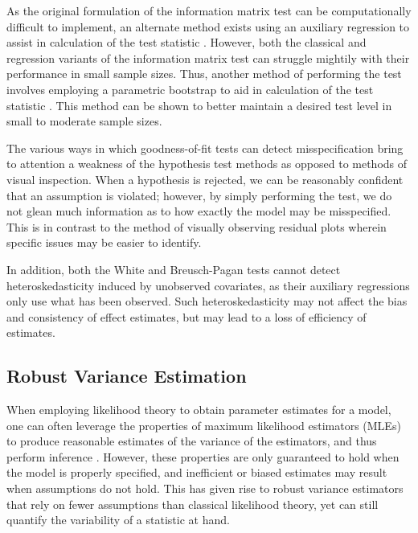 \documentclass[review]{elsarticle}
\begin{document}
        As the original formulation of the information matrix test can be computationally difficult to implement, an alternate method exists using an
		auxiliary regression to assist in calculation of the test statistic \citep{Chesher}. However, both the classical and regression variants of the information matrix test can struggle mightily with their performance in small sample sizes. Thus, another method of performing the test involves employing a parametric bootstrap to aid in calculation of the test statistic \citep{Dhaene}. This method can be shown to better maintain a desired test level in small to moderate sample sizes. 

		The various ways in which goodness-of-fit tests can detect misspecification bring to attention a weakness of the hypothesis test methods as opposed to methods of visual inspection.
		When a hypothesis is rejected, we can be reasonably confident that an assumption is violated; however, by simply performing the test, we do not glean much information as to how exactly the
		model may be misspecified. This is in contrast to the method of visually observing residual plots wherein specific issues may be easier to identify.

		In addition, both the White and Breusch-Pagan tests cannot detect heteroskedasticity induced by unobserved covariates, as their auxiliary regressions only use what has been observed. Such heteroskedasticity
		may not affect the bias and consistency of effect estimates, but may lead to a loss of efficiency of estimates. 

	\subsection{Robust Variance Estimation}

		When employing likelihood theory to obtain parameter estimates for a model, one can often leverage the properties of maximum likelihood estimators (MLEs) to produce reasonable estimates of the variance of the
		estimators, and thus perform inference \citep{Millar}. However, these properties are only guaranteed to hold when the model is properly specified, and inefficient or biased estimates may result when assumptions
		do not hold. This has given rise to robust variance estimators that rely on fewer assumptions than classical likelihood theory, yet can still quantify the variability of a statistic
		at hand.
\end{document}
